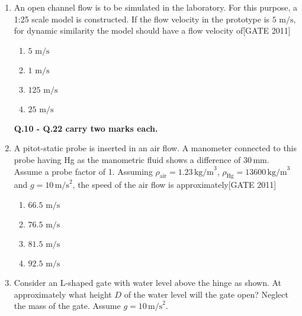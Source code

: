 \documentclass[journal,12pt,onecolumn]{IEEEtran}
\theoremstyle{remark}
\begin{document}
\begin{enumerate}
    \item An open channel flow is to be simulated in the laboratory. For this purpose, a 1:25 scale model is constructed. If the flow velocity in the prototype is $5  \text{ m/s}$, for dynamic similarity the model should have a flow velocity of\hfill{[GATE 2011]}
    \begin{multicols}{4}
    \begin{enumerate}
        \item $5  \text{ m/s}$
        \item $1  \text{ m/s}$
        \item $125  \text{ m/s}$
        \item $25  \text{ m/s}$
    \end{enumerate}
    \end{multicols}

\textbf{Q.10 - Q.22 carry two marks each.}

\item A pitot-static probe is inserted in an air flow. A manometer connected to this probe having Hg as the manometric fluid shows a difference of $30 \, \text{mm}$. Assume a probe factor of 1. Assuming $\rho_{\text{air}} = 1.23 \, \text{kg/m}^3$, $\rho_{\text{Hg}} = 13600 \, \text{kg/m}^3$ and $g = 10 \, \text{m/s}^2$, the speed of the air flow is approximately\hfill{[GATE 2011]}
  \begin{multicols}{4}
    \begin{enumerate}
        \item $66.5 \text{ m/s}$
        \item $76.5 \text{ m/s}$
        \item $81.5 \text{ m/s}$
        \item $92.5 \text{ m/s}$
    \end{enumerate}
    \end{multicols}

\item Consider an L-shaped gate with water level above the hinge as shown. At approximately what height $D$ of the water level will the gate open? Neglect the mass of the gate. Assume $g = 10 \, \text{m/s}^2$.

\begin{center}


\end{center}
\end{enumerate}
\end{document}
